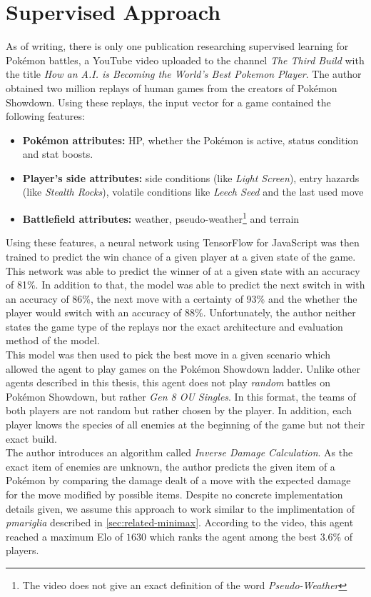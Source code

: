 \section{Supervised Approach}
As of writing, there is only one publication researching supervised learning for Pokémon battles,
a YouTube video uploaded to the channel \glqq\emph{The Third Build}\grqq{} with the title \glqq\emph{How an A.I. is
Becoming the World's Best Pokemon Player}\grqq{}\cite{TheThirdBuild:PokemonAI}. The author obtained two million 
replays of human games from the creators of Pokémon Showdown. Using these replays, the input vector for a game
contained the following features:
\begin{itemize}
    \item \textbf{Pokémon attributes:} \ac{HP}, whether the Pokémon is active, status condition and stat boosts.
    \item \textbf{Player's side attributes:} side conditions (like \textit{Light Screen}), entry hazards 
    (like \textit{Stealth Rocks}), volatile conditions like \textit{Leech Seed} and the last used move
    \item \textbf{Battlefield attributes:} weather, pseudo-weather\footnote{The video does not give an exact 
    definition of the word \textit{Pseudo-Weather}} and terrain
\end{itemize}
Using these features, a neural network using TensorFlow for JavaScript was then trained to predict the 
win chance of a given player at a given state of the game. This network was able to predict the winner
of at a given state with an accuracy of 81\%. In addition to that, the model was able to predict the next
switch in with an accuracy of 86\%, the next move with a certainty of 93\% and the whether the
player would switch with an accuracy of 88\%. Unfortunately, the author neither states the game type of
the replays nor the exact architecture and evaluation method of the model. \\
This model was then used to pick the best move in a given scenario which allowed the agent to play games
on the Pokémon Showdown ladder. Unlike other agents described in this thesis, this agent does not play
\emph{random} battles on Pokémon Showdown, but rather \emph{Gen 8 OU Singles}. In this format, the 
teams of both players are not random but rather chosen by the player. In addition, each player knows
the species of all enemies at the beginning of the game but not their exact build. \\
The author introduces an algorithm called \textit{Inverse Damage Calculation}. As the exact item of 
enemies are unknown, the author predicts the given item of a Pokémon by comparing the damage dealt
of a move with the expected damage for the move modified by possible items. Despite no concrete 
implementation details given, we assume this approach to work similar to the implimentation 
of \emph{pmariglia} described in \ref{sec:related-minimax}.
According to the video, this agent reached a maximum Elo of $1630$ which ranks the agent among the 
best $3.6\%$ of players.